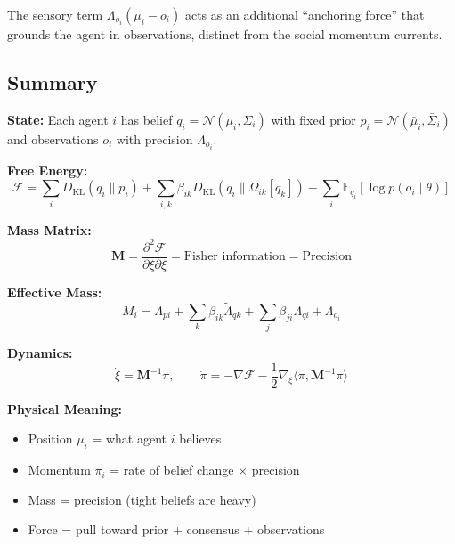 \documentclass[12pt]{article}
\begin{document}
The sensory term $\Lambda_{o_i}(\mu_i - o_i)$ acts as an additional ``anchoring force'' that grounds the agent in observations, distinct from the social momentum currents.

\subsection{Summary}

\begin{tcolorbox}[colback=gray!5,colframe=gray!75,title=The Complete Theory with Sensory Evidence]

\textbf{State:} Each agent $i$ has belief $q_i = \mathcal{N}(\mu_i, \Sigma_i)$ with fixed prior $p_i = \mathcal{N}(\bar{\mu}_i, \bar{\Sigma}_i)$ and observations $o_i$ with precision $\Lambda_{o_i}$.

\textbf{Free Energy:}
\begin{equation}
\mathcal{F} = \sum_i D_{\mathrm{KL}}(q_i \| p_i) + \sum_{i,k} \beta_{ik} D_{\mathrm{KL}}(q_i \| \Omega_{ik}[q_k]) - \sum_i \mathbb{E}_{q_i}[\log p(o_i \mid \theta)]
\end{equation}

\textbf{Mass Matrix:}
\begin{equation}
\mathbf{M} = \frac{\partial^2 \mathcal{F}}{\partial \xi \partial \xi} = \text{Fisher information} = \text{Precision}
\end{equation}

\textbf{Effective Mass:}
\begin{equation}
M_i = \bar{\Lambda}_{pi} + \sum_k \beta_{ik}\tilde{\Lambda}_{qk} + \sum_j \beta_{ji}\Lambda_{qi} + \Lambda_{o_i}
\end{equation}

\textbf{Dynamics:}
\begin{equation}
\dot{\xi} = \mathbf{M}^{-1}\pi, \qquad \dot{\pi} = -\nabla\mathcal{F} - \frac{1}{2}\nabla_\xi\langle\pi, \mathbf{M}^{-1}\pi\rangle
\end{equation}

\textbf{Physical Meaning:}
\begin{itemize}
    \item Position $\mu_i$ = what agent $i$ believes
    \item Momentum $\pi_i$ = rate of belief change $\times$ precision
    \item Mass = precision (tight beliefs are heavy)
    \item Force = pull toward prior + consensus + observations
\end{itemize}

\end{tcolorbox}







\end{document}
